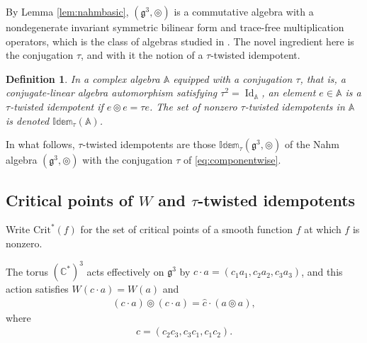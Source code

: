 \documentclass[leqno,10pt]{amsart}
\newtheorem{definition}[theorem]{Definition}%
\theoremstyle{definition}
\numberwithin{equation}{section}
\newcommand{\idem}{\mathbb{Idem}}
\newcommand{\tmlt}{\circledcirc}
\newcommand{\alg}{\mathbb{A}}
\newcommand{\id}{\operatorname{Id}}
\newcommand{\g}{\mathfrak{g}}
\newcommand{\com}{\mathbb C}
\newcommand{\crtnt}{\mathrm{Crit}^*}
\begin{document}
By Lemma \ref{lem:nahmbasic}, $(\g^{3}, \tmlt)$ is a commutative algebra with a nondegenerate invariant symmetric bilinear form and trace-free multiplication operators, which is the class of algebras studied in \cite{Fox-cubicpoly, Fox-trace}. The novel ingredient here is the conjugation $\tau$, and with it the notion of a $\tau$-twisted idempotent.

\begin{definition}\label{def:twisted}
In a complex algebra $\alg$ equipped with a conjugation $\tau$, that is, a conjugate-linear algebra automorphism satisfying $\tau^{2} = \id_{\alg}$, an element $e \in \alg$ is a \emph{$\tau$-twisted idempotent} if $e \tmlt e = \tau e$. The set of nonzero $\tau$-twisted idempotents in $\alg$ is denoted $\idem_{\tau}(\alg)$.
\end{definition}
In what follows, $\tau$-twisted idempotents are those $\idem_{\tau}(\g^{3}, \tmlt)$ of the Nahm algebra $(\g^{3}, \tmlt)$ with the conjugation $\tau$ of \eqref{eq:componentwise}.

\subsection{Critical points of $W$ and $\tau$-twisted idempotents}
Write $\crtnt(f)$ for the set of critical points of a smooth function $f$ at which $f$ is nonzero. 

The torus $(\com^{\ast})^{3}$ acts effectively on $\g^{3}$ by $c \cdot a = (c_{1}a_{1}, c_{2}a_{2}, c_{3}a_{3})$, and this action satisfies $W(c \cdot a) = W(a)$ and
\begin{align}\label{caca}
(c\cdot a) \tmlt (c\cdot a) = \hat{c}\cdot (a\tmlt a),
\end{align}
where 
\begin{align}\label{hatc}
\hat{c} = (c_{2}c_{3}, c_{3}c_{1}, c_{1}c_{2}).
\end{align}
\end{document}
